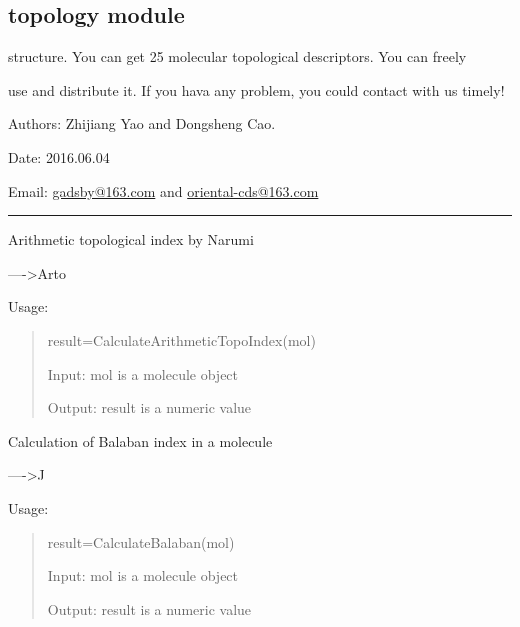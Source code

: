 \documentclass[letterpaper,10pt,english]{sphinxmanual}
\begin{document}
\subsection{topology module}
\label{reference/topology::doc}\label{reference/topology:module-topology}\label{reference/topology:topology-module}
structure. You can get 25 molecular topological descriptors. You can freely

use and distribute it. If you hava  any problem, you could contact with us timely!

Authors: Zhijiang Yao and Dongsheng Cao.

Date: 2016.06.04

Email: \href{mailto:gadsby@163.com}{gadsby@163.com} and \href{mailto:oriental-cds@163.com}{oriental-cds@163.com}


\bigskip\hrule{}\bigskip


\begin{fulllineitems}
\label{reference/topology:topology.CalculateArithmeticTopoIndex}
Arithmetic topological index by Narumi

----\textgreater{}Arto

Usage:
\begin{quote}

result=CalculateArithmeticTopoIndex(mol)

Input: mol is a molecule object

Output: result is a numeric value
\end{quote}

\end{fulllineitems}


\begin{fulllineitems}
\label{reference/topology:topology.CalculateBalaban}
Calculation of Balaban index in a molecule

----\textgreater{}J

Usage:
\begin{quote}

result=CalculateBalaban(mol)

Input: mol is a molecule object

Output: result is a numeric value
\end{quote}

\end{fulllineitems}
\end{document}
